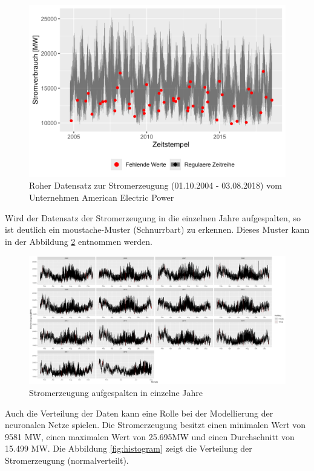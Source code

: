 \documentclass[11pt,ngerman,a4paper,]{article}
\begin{document}
\begin{figure}[H]
\centering
\includegraphics[width=1.0\textwidth]{plots/raw_AEP_MW.png}
\caption{Roher Datensatz zur Stromerzeugung (01.10.2004 - 03.08.2018) vom Unternehmen American Electric Power}
\label{fig:raw_AEP}
\end{figure}

Wird der Datensatz der Stromerzeugung in die einzelnen Jahre aufgespalten, so ist deutlich ein moustache-Muster (Schnurrbart) zu erkennen. Dieses Muster kann in der Abbildung \ref{fig:raw_years} entnommen werden.

\begin{figure}[H]
\centering
\includegraphics[width=1.0\textwidth]{plots/raw_years.png}
\caption{Stromerzeugung aufgespalten in einzelne Jahre}
\label{fig:raw_years}
\end{figure}

Auch die Verteilung der Daten kann eine Rolle bei der Modellierung der neuronalen Netze spielen. Die Stromerzeugung besitzt einen minimalen Wert von 9581 MW, einen maximalen Wert von 25.695MW und einen Durchschnitt von 15.499 MW. Die Abbildung \ref{fig:histogram} zeigt die Verteilung der Stromerzeugung (normalverteilt).
\end{document}
